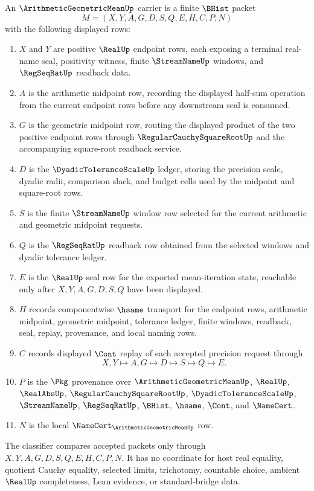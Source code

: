 \begin{definition}
\label{def:arithmetic-geometric-mean-carrier}
An $\ArithmeticGeometricMeanUp$ carrier is a finite $\BHist$ packet
$$
M=(X,Y,A,G,D,S,Q,E,H,C,P,N)
$$
with the following displayed rows:
\begin{enumerate}
\item $X$ and $Y$ are positive $\RealUp$ endpoint rows, each exposing a terminal real-name seal, positivity witness, finite $\StreamNameUp$ windows, and $\RegSeqRatUp$ readback data.
\item $A$ is the arithmetic midpoint row, recording the displayed half-sum operation from the current endpoint rows before any downstream seal is consumed.
\item $G$ is the geometric midpoint row, routing the displayed product of the two positive endpoint rows through $\RegularCauchySquareRootUp$ and the accompanying square-root readback service.
\item $D$ is the $\DyadicToleranceScaleUp$ ledger, storing the precision scale, dyadic radii, comparison slack, and budget cells used by the midpoint and square-root rows.
\item $S$ is the finite $\StreamNameUp$ window row selected for the current arithmetic and geometric midpoint requests.
\item $Q$ is the $\RegSeqRatUp$ readback row obtained from the selected windows and dyadic tolerance ledger.
\item $E$ is the $\RealUp$ seal row for the exported mean-iteration state, reachable only after $X,Y,A,G,D,S,Q$ have been displayed.
\item $H$ records componentwise $\hsame$ transport for the endpoint rows, arithmetic midpoint, geometric midpoint, tolerance ledger, finite windows, readback, seal, replay, provenance, and local naming rows.
\item $C$ records displayed $\Cont$ replay of each accepted precision request through
$$
X,Y\longmapsto A,G\longmapsto D\longmapsto S\longmapsto Q\longmapsto E .
$$
\item $P$ is the $\Pkg$ provenance over $\ArithmeticGeometricMeanUp$, $\RealUp$, $\RealAbsUp$, $\RegularCauchySquareRootUp$, $\DyadicToleranceScaleUp$, $\StreamNameUp$, $\RegSeqRatUp$, $\BHist$, $\hsame$, $\Cont$, and $\NameCert$.
\item $N$ is the local $\NameCert_{\ArithmeticGeometricMeanUp}$ row.
\end{enumerate}
The classifier compares accepted packets only through $X,Y,A,G,D,S,Q,E,H,C,P,N$. It has no coordinate for host real equality, quotient Cauchy equality, selected limits, trichotomy, countable choice, ambient $\RealUp$ completeness, Lean evidence, or standard-bridge data.
\end{definition}

